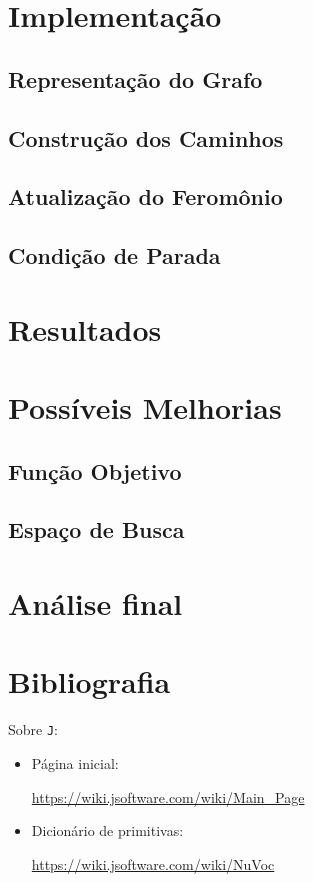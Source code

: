 \documentclass{article}
\newcommand{\lang}{\texttt{J}}
\begin{document}
\section{Implementação}
\subsection{Representação do Grafo}
\subsection{Construção dos Caminhos}
\subsection{Atualização do Feromônio}
\subsection{Condição de Parada}

\section{Resultados}

\section{Possíveis Melhorias}
\subsection{Função Objetivo}
\subsection{Espaço de Busca}

\section{Análise final}

\section{Bibliografia}

Sobre \lang:
\begin{itemize}
    \item Página inicial: \par
        \url{https://wiki.jsoftware.com/wiki/Main_Page}
    \item Dicionário de primitivas: \par
        \url{https://wiki.jsoftware.com/wiki/NuVoc}
\end{itemize}
\end{document}
